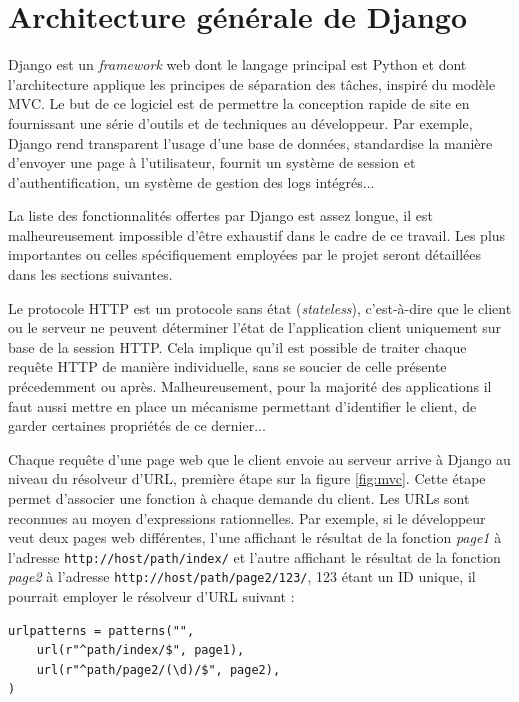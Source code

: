 \documentclass[a4paper,12pt]{article}
\begin{document}
\section{Architecture générale de Django}

Django est un \textit{framework} web dont le langage principal est Python et
dont l'architecture applique les principes de séparation des tâches, inspiré du
modèle MVC. Le but de ce logiciel est de permettre la conception rapide de site
en fournissant une série d'outils et de techniques au développeur. Par exemple,
Django rend transparent l'usage d'une base de données, standardise la manière
d'envoyer une page à l'utilisateur, fournit un système de session et d'authentification,
un système de gestion des logs intégrés...

La liste des fonctionnalités offertes par Django est assez longue, il est malheureusement
impossible d'être exhaustif dans le cadre de ce travail. Les plus importantes
ou celles spécifiquement employées par le projet seront détaillées dans les sections suivantes.

Le protocole HTTP est un protocole sans état (\textit{stateless}), c'est-à-dire
que le client ou le serveur ne peuvent déterminer l'état de l'application client uniquement
sur base de la session HTTP. Cela implique qu'il est possible de traiter chaque requête HTTP
de manière individuelle, sans se soucier de celle présente précedemment ou après. Malheureusement,
pour la majorité des applications il faut aussi mettre en place un mécanisme permettant
d'identifier le client, de garder certaines propriétés de ce dernier...

Chaque requête d'une page web que le client envoie au serveur arrive 
à Django au niveau du résolveur d'URL, première étape sur la figure \ref{fig:mvc}.
Cette étape permet d'associer une fonction
à chaque demande du client. Les URLs sont reconnues au moyen d'expressions rationnelles.
Par exemple, si le développeur veut deux pages web différentes, l'une affichant
le résultat de la fonction \textit{page1} à l'adresse \texttt{http://host/path/index/} et
l'autre affichant le résultat de la fonction \textit{page2} à l'adresse
\texttt{http://host/path/page2/123/}, 123 étant un ID unique, il pourrait employer
le résolveur d'URL suivant :

\begin{verbatim}
urlpatterns = patterns("",
    url(r"^path/index/$", page1),
    url(r"^path/page2/(\d)/$", page2),
)
\end{verbatim}
\end{document}
